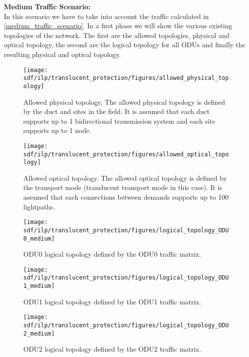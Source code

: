\textbf{Medium Traffic Scenario:}\\

In this scenario we have to take into account the traffic calculated in \ref{medium_traffic_scenario}. In a first phase we will show the various existing topologies of the network. The first are the allowed topologies, physical and optical topology, the second are the logical topology for all ODUs and finally the resulting physical and optical topology.\\

\begin{figure}[h!]
\centering
\texttt{[image: sdf/ilp/translucent\_protection/figures/allowed\_physical\_topology]}
\caption{Allowed physical topology. The allowed physical topology is defined by the duct and sites in the field. It is assumed that each duct supports up to 1 bidirectional transmission system and each site supports up to 1 node.}
\label{allowed3_physical_protectionmedium}
\end{figure}
\newpage
\begin{figure}[h!]
\centering
\texttt{[image: sdf/ilp/translucent\_protection/figures/allowed\_optical\_topology]}
\caption{Allowed optical topology. The allowed optical topology is defined by the transport mode (translucent transport mode in this case). It is assumed that each connections between demands supports up to 100 lightpaths.}
\label{allowed3_optical_protectionmedium}
\end{figure}

\begin{figure}[h!]
\centering
\texttt{[image: sdf/ilp/translucent\_protection/figures/logical\_topology\_ODU0\_medium]}
\caption{ODU0 logical topology defined by the ODU0 traffic matrix.}
\label{logical3_ODU0_protectionmedium}
\end{figure}

\begin{figure}[h!]
\centering
\texttt{[image: sdf/ilp/translucent\_protection/figures/logical\_topology\_ODU1\_medium]}
\caption{ODU1 logical topology defined by the ODU1 traffic matrix.}
\label{logical3_ODU1_protectionmedium}
\end{figure}
\newpage
\begin{figure}[h!]
\centering
\texttt{[image: sdf/ilp/translucent\_protection/figures/logical\_topology\_ODU2\_medium]}
\caption{ODU2 logical topology defined by the ODU2 traffic matrix.}
\label{logical3_ODU2_protectionmedium}
\end{figure}

